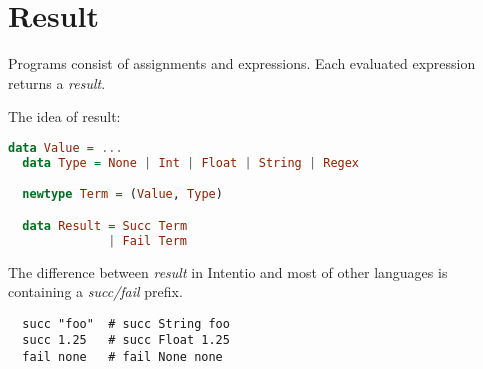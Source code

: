 \chapter{Result}

Programs consist of assignments and expressions. Each evaluated expression returns a \emph{result}.

The idea of result:
\begin{lstlisting}[language=haskell]
  data Value = ...
  data Type = None | Int | Float | String | Regex

  newtype Term = (Value, Type)

  data Result = Succ Term
              | Fail Term
\end{lstlisting}

The difference between \emph{result} in Intentio and most of other languages is containing a \emph{succ/fail} prefix.

\begin{example}
\begin{lstlisting}
  succ "foo"  # succ String foo
  succ 1.25   # succ Float 1.25
  fail none   # fail None none
\end{lstlisting}
\end{example}
